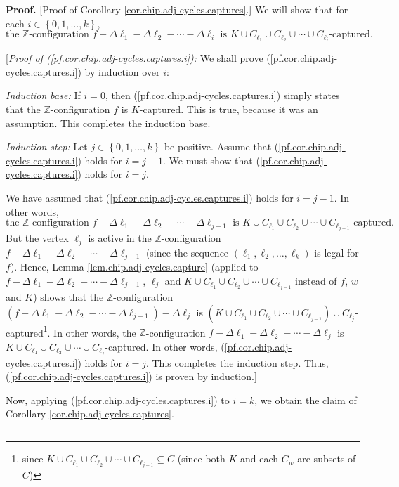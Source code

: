 \documentclass[numbers=enddot,12pt,final,onecolumn,notitlepage]{scrartcl}%
\theoremstyle{definition}
\newenvironment{proof}[1][Proof]{\noindent\textbf{#1.} }{\ \rule{0.5em}{0.5em}}
\newcommand{\ZZ}{\mathbb{Z}}
\begin{document}
\begin{proof}
[Proof of Corollary \ref{cor.chip.adj-cycles.captures}.] We will show that for
each $i\in\left\{  0,1,\ldots,k\right\}  $,
\begin{equation}
\text{the } \ZZ\text{-configuration }f-\Delta\ell_{1}-\Delta\ell_{2}-\cdots-\Delta\ell
_{i}\text{ is }K\cup C_{\ell_{1}}\cup C_{\ell_{2}}\cup\cdots\cup C_{\ell_{i}%
}\text{-captured.}\label{pf.cor.chip.adj-cycles.captures.i}%
\end{equation}


[\textit{Proof of (\ref{pf.cor.chip.adj-cycles.captures.i}):} We shall prove
(\ref{pf.cor.chip.adj-cycles.captures.i}) by induction over $i$:

\textit{Induction base:} If $i=0$, then
(\ref{pf.cor.chip.adj-cycles.captures.i}) simply states that the $\ZZ$-configuration
$f$ is $K$-captured. This is true, because it was an assumption. This
completes the induction base.

\textit{Induction step:} Let $j\in\left\{  0,1,\ldots,k\right\}  $ be
positive. Assume that (\ref{pf.cor.chip.adj-cycles.captures.i}) holds for
$i=j-1$. We must show that (\ref{pf.cor.chip.adj-cycles.captures.i}) holds for
$i=j$.

We have assumed that (\ref{pf.cor.chip.adj-cycles.captures.i}) holds for
$i=j-1$. In other words,
\[
\text{the }\ZZ\text{-configuration }f-\Delta\ell_{1}-\Delta\ell_{2}-\cdots-\Delta
\ell_{j-1}\text{ is }K\cup C_{\ell_{1}}\cup C_{\ell_{2}}\cup\cdots\cup
C_{\ell_{j-1}}\text{-captured.}%
\]
But the vertex $\ell_{j}$ is active in the $\ZZ$-configuration $f-\Delta\ell
_{1}-\Delta\ell_{2}-\cdots-\Delta\ell_{j-1}$ (since the sequence $\left(
\ell_{1},\ell_{2},\ldots,\ell_{k}\right)  $ is legal for $f$). Hence, Lemma
\ref{lem.chip.adj-cycles.capture} (applied to $f-\Delta\ell_{1}-\Delta\ell
_{2}-\cdots-\Delta\ell_{j-1}$, $\ell_{j}$ and $K\cup C_{\ell_{1}}\cup
C_{\ell_{2}}\cup\cdots\cup C_{\ell_{j-1}}$ instead of $f$, $w$ and $K$) shows
that the $\ZZ$-configuration $\left(  f-\Delta\ell_{1}-\Delta\ell_{2}-\cdots
-\Delta\ell_{j-1}\right)  -\Delta\ell_{j}$ is $\left(  K\cup C_{\ell_{1}}\cup
C_{\ell_{2}}\cup\cdots\cup C_{\ell_{j-1}}\right)  \cup C_{\ell_{j}}%
$-captured\footnote{since $K\cup C_{\ell_{1}}\cup C_{\ell_{2}}\cup\cdots\cup
C_{\ell_{j-1}}\subseteq C$ (since both $K$ and each $C_{w}$ are subsets of
$C$)}. In other words, the $\ZZ$-configuration $f-\Delta\ell_{1}-\Delta\ell
_{2}-\cdots-\Delta\ell_{j}$ is $K\cup C_{\ell_{1}}\cup C_{\ell_{2}}\cup
\cdots\cup C_{\ell_{j}}$-captured. In other words,
(\ref{pf.cor.chip.adj-cycles.captures.i}) holds for $i=j$. This completes the
induction step. Thus, (\ref{pf.cor.chip.adj-cycles.captures.i}) is proven by induction.]

Now, applying (\ref{pf.cor.chip.adj-cycles.captures.i}) to $i=k$, we obtain
the claim of Corollary \ref{cor.chip.adj-cycles.captures}.
\end{proof}
\end{document}
